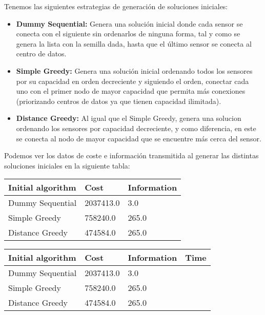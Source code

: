 \documentclass{article}
\begin{document}
\begin{enumerate}
  Tenemos las siguientes estrategias de generación de soluciones iniciales:
  \begin{itemize}
    \item \textbf{Dummy Sequential:} Genera una solución inicial donde cada sensor se conecta con el siguiente sin ordenarlos de ninguna forma, tal y como se genera la lista con la semilla dada, hasta que el último sensor se conecta al centro de datos.
    \item \textbf{Simple Greedy:} Genera una solución inicial ordenando todos los sensores por su capacidad en orden decreciente y siguiendo el orden, conectar cada uno con el primer nodo de mayor capacidad que permita más conexiones (priorizando centros de datos ya que tienen capacidad ilimitada).
    \item \textbf{Distance Greedy:} Al igual que el Simple Greedy, genera una solucion ordenando los sensores por capacidad decreciente, y como diferencia, en este se conecta al nodo de mayor capacidad que se encuentre más cerca del sensor.
  \end{itemize}
  Podemos ver los datos de coste e información transmitida al generar las distintas soluciones iniciales en la siguiente tabla:
  \begin{center}
    \begin{tabular}{ | l | l | l | }
        \hline
        \rowcolor{DarkGrey}
        Initial algorithm & Cost & Information \\ \hline \hline
        Dummy Sequential & 2037413.0 & 3.0 \\ \hline
        \rowcolor{LightGrey}
        Simple Greedy & 758240.0 & 265.0 \\ \hline
        Distance Greedy & 474584.0 & 265.0 \\ \hline
    \end{tabular}
  \end{center}
  \begin{center}
    \begin{tabular}{ | l | l | l | l | }
        \hline
        \rowcolor{DarkGrey}
        Initial algorithm & Cost & Information & Time \\ \hline \hline
        Dummy Sequential & 2037413.0 & 3.0 & \\ \hline
        \rowcolor{LightGrey}
        Simple Greedy & 758240.0 & 265.0 \\ \hline
        Distance Greedy & 474584.0 & 265.0 \\ \hline
    \end{tabular}
  \end{center}


\end{enumerate}
\end{document}
